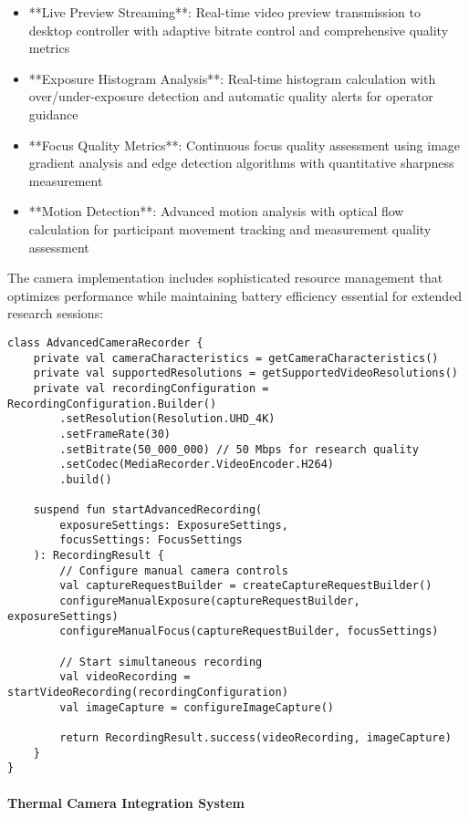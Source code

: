 \documentclass[11pt,a4paper]{report}
\begin{document}
\begin{itemize}
\item **Live Preview Streaming**: Real-time video preview transmission to desktop controller with adaptive bitrate control
  and comprehensive quality metrics
\item **Exposure Histogram Analysis**: Real-time histogram calculation with over/under-exposure detection and automatic
  quality alerts for operator guidance
\item **Focus Quality Metrics**: Continuous focus quality assessment using image gradient analysis and edge detection
  algorithms with quantitative sharpness measurement
\item **Motion Detection**: Advanced motion analysis with optical flow calculation for participant movement tracking and
  measurement quality assessment

\end{itemize}
The camera implementation includes sophisticated resource management that optimizes performance while maintaining
battery efficiency essential for extended research sessions:

\begin{verbatim}
class AdvancedCameraRecorder {
    private val cameraCharacteristics = getCameraCharacteristics()
    private val supportedResolutions = getSupportedVideoResolutions()
    private val recordingConfiguration = RecordingConfiguration.Builder()
        .setResolution(Resolution.UHD_4K)
        .setFrameRate(30)
        .setBitrate(50_000_000) // 50 Mbps for research quality
        .setCodec(MediaRecorder.VideoEncoder.H264)
        .build()

    suspend fun startAdvancedRecording(
        exposureSettings: ExposureSettings,
        focusSettings: FocusSettings
    ): RecordingResult {
        // Configure manual camera controls
        val captureRequestBuilder = createCaptureRequestBuilder()
        configureManualExposure(captureRequestBuilder, exposureSettings)
        configureManualFocus(captureRequestBuilder, focusSettings)

        // Start simultaneous recording
        val videoRecording = startVideoRecording(recordingConfiguration)
        val imageCapture = configureImageCapture()

        return RecordingResult.success(videoRecording, imageCapture)
    }
}
\end{verbatim}

\paragraph{Thermal Camera Integration System}
\end{document}
